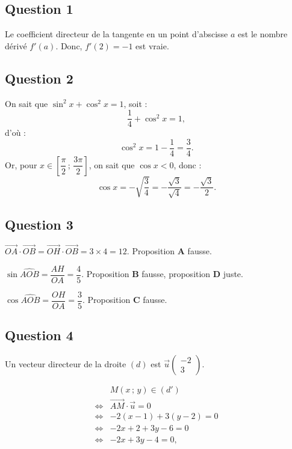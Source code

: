 \subsection*{Question 1}

Le coefficient directeur de la tangente en un point d'abscisse \(a\) est le nombre dérivé \(f'(a)\). Donc, \(f'(2) = -1\) est vraie.

\subsection*{Question 2}

On sait que \(\sin^2 x + \cos^2 x = 1\), soit :
\[
\dfrac{1}{4} + \cos^2 x = 1,
\]
d'où :
\[
\cos^2 x = 1 - \dfrac{1}{4} = \dfrac{3}{4}.
 \]
Or, pour \( x \in \left[\dfrac{\pi}{2} \,;\, \dfrac{3\pi}{2}\right] \), on sait que \(\cos x < 0\), donc :
\[
\cos x = -\sqrt{\dfrac{3}{4}} = -\dfrac{\sqrt{3}}{\sqrt{4}} = -\dfrac{\sqrt{3}}{2}.
\]

\subsection*{Question 3}

\(\overrightarrow{OA} \cdot \overrightarrow{OB} = \overrightarrow{OH} \cdot \overrightarrow{OB} = 3 \times 4 = 12\). Proposition \textbf{A} fausse.

\(\sin \widehat{AOB} = \dfrac{AH}{OA} = \dfrac{4}{5}\). Proposition \textbf{B} fausse, proposition \textbf{D} juste.

\(\cos \widehat{AOB} = \dfrac{OH}{OA} = \dfrac{3}{5}\). Proposition \textbf{C} fausse.

\subsection*{Question 4}

Un vecteur directeur de la droite \((d)\) est \(\vec{u} \begin{pmatrix} -2 \\ 3 \end{pmatrix}\).

\begin{align*}
&M(x \,;\, y) \in (d') \\
\iff &\overrightarrow{AM} \cdot \vec{u} = 0 \\
\iff &-2(x - 1) + 3(y - 2) = 0 \\
\iff &-2x + 2 + 3y - 6 = 0 \\
\iff &-2x + 3y - 4 = 0,
\end{align*}

